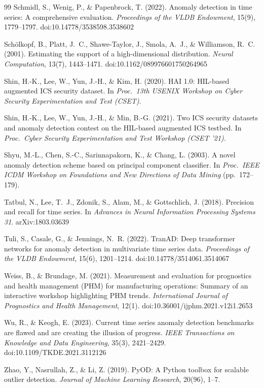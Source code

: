 \documentclass[11pt]{article}
\begin{document}
\begin{thebibliography}{99}
 Schmidl, S., Wenig, P., \& Papenbrock, T. (2022). Anomaly detection in time series: A comprehensive evaluation. \emph{Proceedings of the VLDB Endowment}, 15(9), 1779--1797. doi:10.14778/3538598.3538602

 Sch\"olkopf, B., Platt, J.~C., Shawe-Taylor, J., Smola, A.~J., \& Williamson, R.~C. (2001). Estimating the support of a high-dimensional distribution. \emph{Neural Computation}, 13(7), 1443--1471. doi:10.1162/089976601750264965

 Shin, H.-K., Lee, W., Yun, J.-H., \& Kim, H. (2020). HAI 1.0: HIL-based augmented ICS security dataset. In \emph{Proc.\ 13th USENIX Workshop on Cyber Security Experimentation and Test (CSET)}.

 Shin, H.-K., Lee, W., Yun, J.-H., \& Min, B.-G. (2021). Two ICS security datasets and anomaly detection contest on the HIL-based augmented ICS testbed. In \emph{Proc.\ Cyber Security Experimentation and Test Workshop (CSET '21)}.

 Shyu, M.-L., Chen, S.-C., Sarinnapakorn, K., \& Chang, L. (2003). A novel anomaly detection scheme based on principal component classifier. In \emph{Proc.\ IEEE ICDM Workshop on Foundations and New Directions of Data Mining} (pp.\ 172--179).

 Tatbul, N., Lee, T.~J., Zdonik, S., Alam, M., \& Gottschlich, J. (2018). Precision and recall for time series. In \emph{Advances in Neural Information Processing Systems 31}. arXiv:1803.03639

 Tuli, S., Casale, G., \& Jennings, N.~R. (2022). TranAD: Deep transformer networks for anomaly detection in multivariate time series data. \emph{Proceedings of the VLDB Endowment}, 15(6), 1201--1214. doi:10.14778/3514061.3514067

 Weiss, B., \& Brundage, M. (2021). Measurement and evaluation for prognostics and health management (PHM) for manufacturing operations: Summary of an interactive workshop highlighting PHM trends. \emph{International Journal of Prognostics and Health Management}, 12(1). doi:10.36001/ijphm.2021.v12i1.2653

 Wu, R., \& Keogh, E. (2023). Current time series anomaly detection benchmarks are flawed and are creating the illusion of progress. \emph{IEEE Transactions on Knowledge and Data Engineering}, 35(3), 2421--2429. doi:10.1109/TKDE.2021.3112126

 Zhao, Y., Nasrullah, Z., \& Li, Z. (2019). PyOD: A Python toolbox for scalable outlier detection. \emph{Journal of Machine Learning Research}, 20(96), 1--7.

\end{thebibliography}
\end{document}
